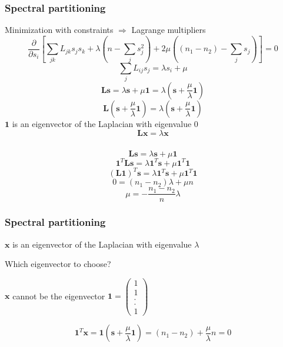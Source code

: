\documentclass{beamer}
\begin{document}
\begin{frame}
    \frametitle{Spectral partitioning}
    \centering
Minimization with constraints $\Rightarrow$ Lagrange multipliers
    $$\frac{\partial}{\partial s_i}\left[\sum\limits_{jk}L_{jk}s_js_k + \lambda\left(n-\sum\limits_{j}s_j^2\right) + 2\mu\left((n_1-n_2)-\sum\limits_js_j\right)\right] = 0$$
    \pause
    $$\sum\limits_jL_{ij}s_j = \lambda s_i + \mu$$
\justifying
    \pause
$${\mathbf L}{\mathbf s} = \lambda {\mathbf s} + \mu {\mathbf 1} = \lambda \left({\mathbf s} + \frac{\mu}{\lambda}{\mathbf 1}\right)$$
    $${\mathbf L}\left({\mathbf s} + \frac{\mu}{\lambda}{\mathbf 1}\right) = \lambda \left({\mathbf s} + \frac{\mu}{\lambda}{\mathbf 1}\right)$$
    \centering
    ${\mathbf 1}$ is an eigenvector of the Laplacian with eigenvalue $0$
    $${\mathbf L}{\mathbf x}=\lambda {\mathbf x}$$
\end{frame}
\begin{frame}
    \frametitle{}
    \centering
    $${\mathbf L}{\mathbf s} = \lambda {\mathbf s} + \mu {\mathbf 1}$$
    $${\mathbf 1}^T{\mathbf L}{\mathbf s} = \lambda {\mathbf 1}^T{\mathbf s} + \mu {\mathbf 1}^T{\mathbf 1}$$
    $$({\mathbf L}{\mathbf 1})^T{\mathbf s} =\lambda {\mathbf 1}^T{\mathbf s} + \mu {\mathbf 1}^T{\mathbf 1}$$
    $$0 = (n_1-n_2)\lambda + \mu n$$
    $$\mu = -\frac{n_1-n_2}{n}\lambda$$
\end{frame}
\begin{frame}
    \frametitle{Spectral partitioning}
    \centering
    ${\mathbf x}$ is an eigenvector of the Laplacian with eigenvalue $\lambda$ 

    \vspace{1em}
    Which eigenvector to choose?

    \vspace{1em}
    ${\mathbf x}$ cannot be the eigenvector ${\mathbf 1} = \begin{pmatrix}1\\1\\.\\.\\1\end{pmatrix}$

        $${\mathbf 1}^T{\mathbf x} = {\mathbf 1}\left({\mathbf s} + \frac{\mu}{\lambda}{\mathbf 1}\right) = (n_1-n_2) + \frac{\mu}{\lambda}n = 0$$
\end{frame}
\end{document}
